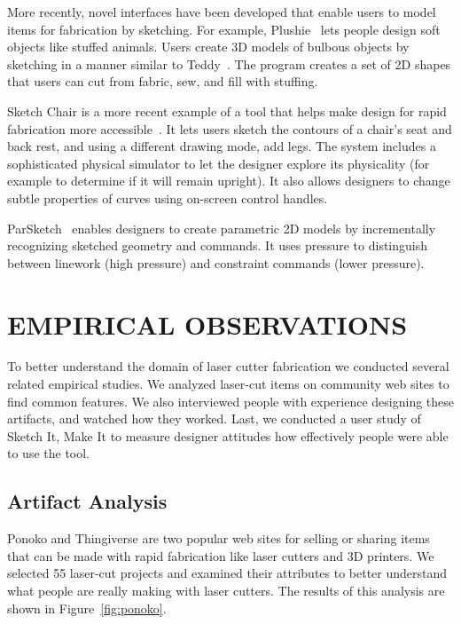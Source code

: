 \documentclass{article}
\begin{document}
More recently, novel interfaces have been developed that enable users
to model items for fabrication by sketching. For example,
Plushie~\cite{mori-plushie} lets people design soft objects like
stuffed animals. Users create 3D models of bulbous objects by
sketching in a manner similar to Teddy~\cite{igarashi-teddy}. The
program creates a set of 2D shapes that users can cut from fabric,
sew, and fill with stuffing. 

Sketch Chair is a more recent example of a tool that helps make design
for rapid fabrication more accessible~\cite{saul-sketch-chair}. It
lets users sketch the contours of a chair's seat and back rest, and
using a different drawing mode, add legs. The system includes a
sophisticated physical simulator to let the designer explore its
physicality (for example to determine if it will remain upright). It
also allows designers to change subtle properties of curves using
on-screen control handles.

ParSketch~\cite{naya-parsketch} enables designers to create parametric
2D models by incrementally recognizing sketched geometry and
commands. It uses pressure to distinguish between linework (high
pressure) and constraint commands (lower pressure).

\section{EMPIRICAL OBSERVATIONS}

To better understand the domain of laser cutter fabrication we
conducted several related empirical studies. We analyzed laser-cut
items on community web sites to find common features. We also
interviewed people with experience designing these artifacts, and
watched how they worked. Last, we conducted a user study of Sketch It,
Make It to measure designer attitudes how effectively people were able
to use the tool.

\subsection{Artifact Analysis}

Ponoko and Thingiverse are two popular web sites for selling or
sharing items that can be made with rapid fabrication like laser
cutters and 3D printers. We selected 55 laser-cut projects and
examined their attributes to better understand what people are really
making with laser cutters. The results of this analysis are shown in
Figure~\ref{fig:ponoko}.
\end{document}
